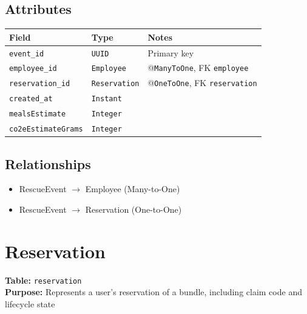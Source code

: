 \documentclass[a4paper,11pt]{article}
\begin{document}
\subsection*{Attributes}
\begin{longtable}{|p{4cm}|p{3cm}|p{6cm}|}
\hline
\textbf{Field} & \textbf{Type} & \textbf{Notes} \\
\hline
\texttt{event\_id} & \texttt{UUID} & Primary key \\
\texttt{employee\_id} & \texttt{Employee} & @\texttt{ManyToOne}, FK \texttt{employee} \\
\texttt{reservation\_id} & \texttt{Reservation} & @\texttt{OneToOne}, FK \texttt{reservation} \\
\texttt{created\_at} & \texttt{Instant} &  \\
\texttt{mealsEstimate} & \texttt{Integer} &  \\
\texttt{co2eEstimateGrams} & \texttt{Integer} & \\
\hline
\end{longtable}

\subsection*{Relationships}
\begin{itemize}
  \item RescueEvent $\rightarrow$ Employee (Many-to-One)
  \item RescueEvent $\rightarrow$ Reservation (One-to-One)
\end{itemize}


\section{Reservation}

\textbf{Table:} \texttt{reservation} \\
\textbf{Purpose:} Represents a user's reservation of a bundle, including claim code and lifecycle state
\end{document}
